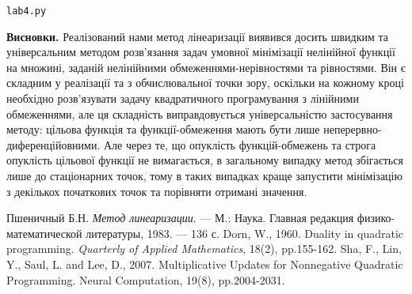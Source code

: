 \documentclass{extreport}
\begin{document}
\noindent\texttt{lab4.py}


\noindent\textbf{Висновки.} Реалізований нами метод лінеаризації виявився досить
швидким та універсальним методом розв'язання задач умовної мінімізації нелінійної
функції на множині, заданій нелінійними обмеженнями-нерівностями та рівностями.
Він є складним у реалізації та з обчислювальної точки зору, оскільки
на кожному кроці необхідно розв'язувати задачу квадратичного програмування з лінійними обмеженнями,
але ця складність виправдовується універсальністю застосування методу: цільова функція та функції-обмеження
мають бути лише неперервно-диференційовними. Але через те, що опуклість функцій-обмежень та строга опуклість
цільової функції не вимагається, в загальному випадку метод збігається лише до стаціонарних точок,
тому в таких випадках краще запустити мінімізацію з декількох початкових точок та порівняти отримані значення.

\begin{thebibliography}{3}
     Пшеничный Б.Н. \emph{Метод линеаризации}. --- М.: Наука. Главная редакция физико-математической литературы, 1983. --- 136 с.
     Dorn, W., 1960. Duality in quadratic programming. \emph{Quarterly of Applied Mathematics}, 18(2), pp.155-162.
     Sha, F., Lin, Y., Saul, L. and Lee, D., 2007. Multiplicative Updates for Nonnegative Quadratic Programming. Neural Computation, 19(8), pp.2004-2031.
\end{thebibliography}
\end{document}
